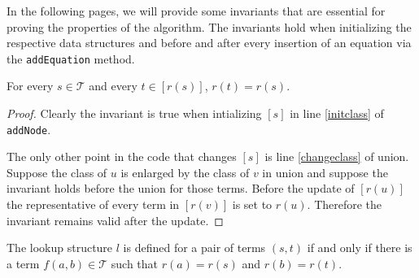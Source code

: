 









In the following pages, we will provide some invariants that are essential for proving the properties of the algorithm.
The invariants hold when initializing the respective data structures and before and after every insertion of an equation via the \texttt{addEquation} method.

\begin{invariant}[Class]

For every $s \in \mathcal{T}$ and every $t \in [r(s)]$, $r(t) = r(s)$.

\label{invar:class}
\end{invariant}
\begin{proof}

Clearly the invariant is true when intializing $[s]$ in line \ref{initclass} of \texttt{addNode}.

The only other point in the code that changes $[s]$ is line \ref{changeclass} of union.
Suppose the class of $u$ is enlarged by the class of $v$ in union and suppose the invariant holds before the union for those terms.
Before the update of $[r(u)]$ the representative of every term in $[r(v)]$ is set to $r(u)$.
Therefore the invariant remains valid after the update.

\end{proof}

\begin{invariant}[Lookup]

The lookup structure $l$ is defined for a pair of terms $(s,t)$ if and only if there is a term $f(a,b) \in \mathcal{T}$ such that $r(a) = r(s)$ and $r(b) = r(t)$.

\end{invariant}

